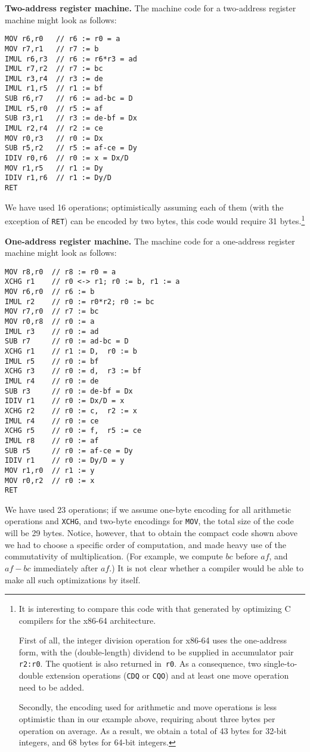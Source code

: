 \documentclass[12pt,oneside]{article}
\def\makepoint#1{\medbreak\noindent{\bf #1.\ }}
\def\nxsubpoint{\refstepcounter{subsubsection}%
  \smallbreak\makepoint{\thesubsubsection}}
\def\emb#1{\textbf{#1.}}
\begin{document}
\nxsubpoint\label{sp:cmp1.2addr}\emb{Two-address register machine}
The machine code for a two-address register machine might look as follows:
\begin{verbatim}
MOV r6,r0   // r6 := r0 = a
MOV r7,r1   // r7 := b
IMUL r6,r3  // r6 := r6*r3 = ad
IMUL r7,r2  // r7 := bc
IMUL r3,r4  // r3 := de
IMUL r1,r5  // r1 := bf
SUB r6,r7   // r6 := ad-bc = D
IMUL r5,r0  // r5 := af
SUB r3,r1   // r3 := de-bf = Dx
IMUL r2,r4  // r2 := ce
MOV r0,r3   // r0 := Dx
SUB r5,r2   // r5 := af-ce = Dy
IDIV r0,r6  // r0 := x = Dx/D
MOV r1,r5   // r1 := Dy
IDIV r1,r6  // r1 := Dy/D
RET
\end{verbatim}
We have used 16 operations; optimistically assuming each of them (with the exception of \texttt{RET}) can be encoded by two bytes, this code would require 31 bytes.\footnote{It is interesting to compare this code with that generated by optimizing C compilers for the x86-64 architecture.

First of all, the integer division operation for x86-64 uses the one-address form, with the (double-length) dividend to be supplied in accumulator pair \texttt{r2:r0}. The quotient is also returned in~\texttt{r0}. As a consequence, two single-to-double extension operations (\texttt{CDQ} or \texttt{CQO}) and at least one move operation need to be added.

Secondly, the encoding used for arithmetic and move operations is less optimistic than in our example above, requiring about three bytes per operation on average. As a result, we obtain a total of 43 bytes for 32-bit integers, and 68 bytes for 64-bit integers.}

\nxsubpoint\label{sp:cmp1.1addr}\emb{One-address register machine}
The machine code for a one-address register machine might look as follows:
\begin{verbatim}
MOV r8,r0  // r8 := r0 = a
XCHG r1    // r0 <-> r1; r0 := b, r1 := a
MOV r6,r0  // r6 := b
IMUL r2    // r0 := r0*r2; r0 := bc
MOV r7,r0  // r7 := bc
MOV r0,r8  // r0 := a
IMUL r3    // r0 := ad
SUB r7     // r0 := ad-bc = D
XCHG r1    // r1 := D,  r0 := b
IMUL r5    // r0 := bf
XCHG r3    // r0 := d,  r3 := bf
IMUL r4    // r0 := de
SUB r3     // r0 := de-bf = Dx
IDIV r1    // r0 := Dx/D = x
XCHG r2    // r0 := c,  r2 := x
IMUL r4    // r0 := ce
XCHG r5    // r0 := f,  r5 := ce
IMUL r8    // r0 := af
SUB r5     // r0 := af-ce = Dy
IDIV r1    // r0 := Dy/D = y
MOV r1,r0  // r1 := y
MOV r0,r2  // r0 := x
RET
\end{verbatim}
We have used 23 operations; if we assume one-byte encoding for all arithmetic operations and \texttt{XCHG}, and two-byte encodings for \texttt{MOV}, the total size of the code will be 29 bytes. Notice, however, that to obtain the compact code shown above we had to choose a specific order of computation, and made heavy use of the commutativity of multiplication. (For example, we compute $bc$ before $af$, and $af-bc$ immediately after $af$.) It is not clear whether a compiler would be able to make all such optimizations by itself.
\end{document}
